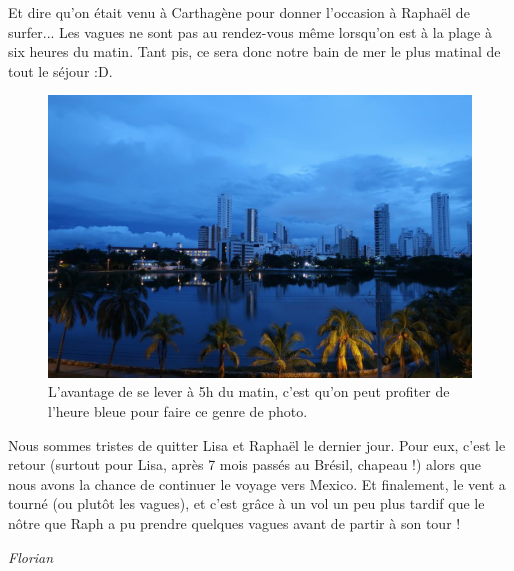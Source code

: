 Et dire qu'on était venu à Carthagène pour donner l'occasion à Raphaël
de surfer... Les vagues ne sont pas au rendez-vous même lorsqu'on est à
la plage à six heures du matin. Tant pis, ce sera donc notre bain de mer
le plus matinal de tout le séjour :D.

\begin{figure}
\centering
\includegraphics{images/20180917_laguito.JPG}
\caption{L'avantage de se lever à 5h du matin, c'est qu'on peut profiter
de l'heure bleue pour faire ce genre de photo.}
\end{figure}

Nous sommes tristes de quitter Lisa et Raphaël le dernier jour. Pour
eux, c'est le retour (surtout pour Lisa, après 7 mois passés au Brésil,
chapeau !) alors que nous avons la chance de continuer le voyage vers
Mexico. Et finalement, le vent a tourné (ou plutôt les vagues), et c'est
grâce à un vol un peu plus tardif que le nôtre que Raph a pu prendre
quelques vagues avant de partir à son tour !

\emph{Florian}
